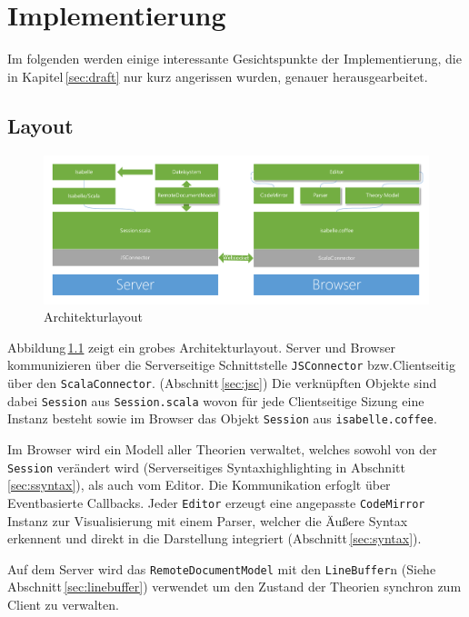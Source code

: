 \chapter{Implementierung}
\label{sec:imp}

Im folgenden werden einige interessante Gesichtspunkte der Implementierung, die in
Kapitel\,\ref{sec:draft} nur kurz angerissen wurden, genauer herausgearbeitet.

\section{Layout}
\label{sec:layout}

\begin{figure}[ht]
\includegraphics[width=\linewidth]{images/layout}
  \caption{Architekturlayout}
  \label{fig:layout}
\end{figure}

Abbildung\,\ref{fig:layout} zeigt ein grobes Architekturlayout. Server und Browser kommunizieren
über die Serverseitige Schnittstelle \texttt{JSConnector} bzw.Clientseitig über den
\texttt{ScalaConnector}. (Abschnitt\,\ref{sec:jsc}) Die verknüpften Objekte sind dabei
\texttt{Session} aus \texttt{Session.scala} wovon für jede Clientseitige Sizung eine Instanz besteht
sowie im Browser das Objekt \texttt{Session} aus \texttt{isabelle.coffee}.

Im Browser wird ein Modell aller Theorien verwaltet, welches sowohl von der \texttt{Session}
verändert wird (Serverseitiges Syntaxhighlighting in Abschnitt\,\ref{sec:ssyntax}), als auch vom
Editor. Die Kommunikation erfoglt über Eventbasierte Callbacks. Jeder \texttt{Editor} erzeugt eine
angepasste \texttt{CodeMirror} Instanz zur Visualisierung mit einem Parser, welcher die Äußere
Syntax erkennent und direkt in die Darstellung integriert (Abschnitt\,\ref{sec:syntax}).

Auf dem Server wird das \texttt{RemoteDocumentModel} mit den \texttt{LineBuffer}n (Siehe
Abschnitt\,\ref{sec:linebuffer}) verwendet um den Zustand der Theorien synchron zum Client zu
verwalten.

